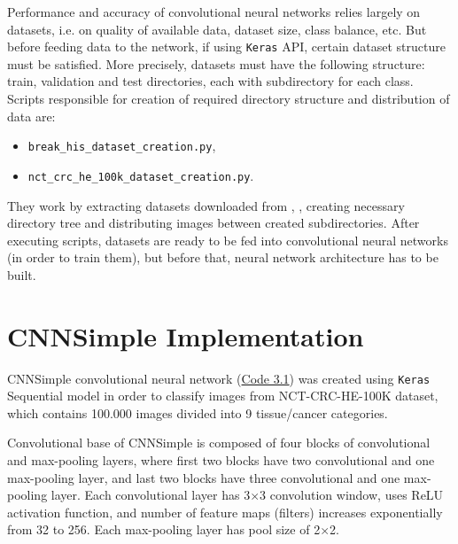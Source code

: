 Performance and accuracy of convolutional neural networks relies largely on datasets, i.e. on quality of available data, dataset size, class balance, etc. But before feeding data to the network, if using \texttt{Keras} API, certain dataset structure must be satisfied. More precisely, datasets must have the following structure: train, validation and test directories, each with subdirectory for each class. Scripts responsible for creation of required directory structure and distribution of data are:
\begin{itemize}
	\itemsep 0em
	\item \texttt{break\_his\_dataset\_creation.py},
	\item \texttt{nct\_crc\_he\_100k\_dataset\_creation.py}.
\end{itemize} 
They work by extracting datasets downloaded from \cite{breakhis_bib}, \cite{nctcrche100k_bib}, creating necessary directory tree and distributing images between created subdirectories. After executing scripts, datasets are ready to be fed into convolutional neural networks (in order to train them), but before that, neural network architecture has to be built.
\clearpage

\section{CNNSimple Implementation}
\label{cnn}

CNNSimple convolutional neural network (\textcolor{red}{\hyperref[src:py1]{Code 3.1}}) was created using \texttt{Keras} Sequential model in order to classify images from NCT-CRC-HE-100K dataset, which contains 100.000 images divided into 9 tissue/cancer categories. 

Convolutional base of CNNSimple is composed of four blocks of convolutional and max-pooling layers, where first two blocks have two convolutional and one max-pooling layer, and last two blocks have three convolutional and one max-pooling layer. Each convolutional layer has 3$\times$3 convolution window, uses ReLU activation function, and number of feature maps (filters) increases exponentially from 32 to 256. Each max-pooling layer has pool size of 2$\times$2. 

